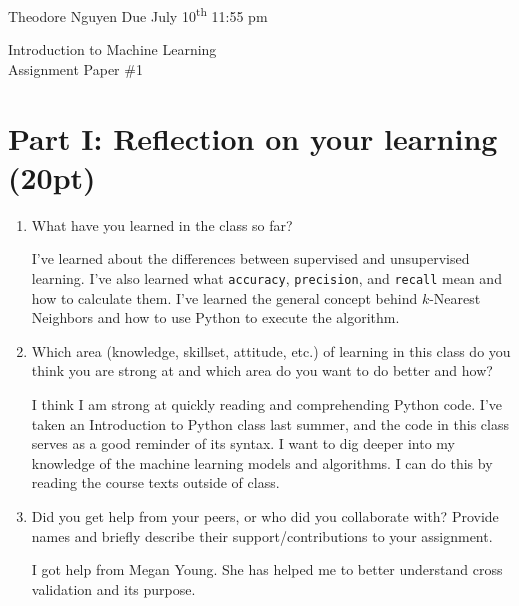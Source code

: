 \documentclass[12pt]{article}
\begin{document}
\noindent Theodore Nguyen \hfill Due July 10\textsuperscript{th} 11:55 pm

\begin{center}
  {\large Introduction to Machine Learning \\ Assignment Paper \#1}
\end{center}

\section*{Part I: Reflection on your learning (20pt)}
\begin{enumerate}[(1)]
    \item What have you learned in the class so far?
    \begin{mdframed}
        I've learned about the differences between supervised and unsupervised learning. I've also learned what \texttt{accuracy}, \texttt{precision}, and \texttt{recall} mean and how to calculate them. I've learned the general concept behind $k$-Nearest Neighbors and how to use Python to execute the algorithm.
    \end{mdframed}
    \item Which area (knowledge, skillset, attitude, etc.) of learning in this class do you think you are strong at and which area do you want to do better and how?
    \begin{mdframed}
        I think I am strong at quickly reading and comprehending Python code. I've taken an Introduction to Python class last summer, and the code in this class serves as a good reminder of its syntax. I want to dig deeper into my knowledge of the machine learning models and algorithms. I can do this by reading the course texts outside of class.
    \end{mdframed}
    \item Did you get help from your peers, or who did you collaborate with? Provide names and briefly describe their support/contributions to your assignment.
    \begin{mdframed}
        I got help from Megan Young. She has helped me to better understand cross validation and its purpose.
    \end{mdframed}
\end{enumerate}
\end{document}

